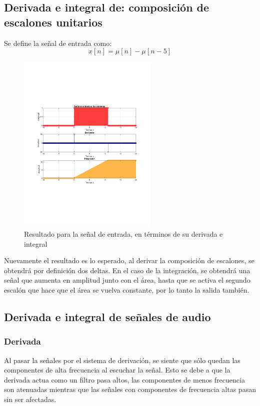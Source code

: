 	\subsection{Derivada e integral de: composición de escalones unitarios}
		 Se define la señal de entrada como:
		\begin{equation}
			x[n] = \mu [n] - \mu [n-5] 
		\end{equation}
		
		\begin{figure}[H]
			\center
			\includegraphics[width=0.6\textwidth,clip, trim = {2cm 7.0cm 2.2cm 7.0cm}]{../imgs/3_d.pdf}
			\caption{Resultado para la señal de entrada, en términos de su derivada e integral}
			\label{fig:3_d}
		\end{figure}
		
		Nuevamente el resultado es lo esperado, al derivar la composición de escalones, se obtendrá por definición dos deltas. En el caso de la integración, se obtendrá una señal que aumenta en amplitud junto con el área, hasta que se activa el segundo escalón que hace que el área se vuelva constante, por lo tanto la salida también. 
		
	\subsection{Derivada e integral de señales de audio}
		\subsubsection{Derivada}
			Al pasar la señales por el sistema de derivación, se siente que sólo quedan las componentes de alta frecuencia al escuchar la señal. Esto se debe a que la derivada actua como un filtro pasa altos, las componentes de menos frecuencia son atenuadas mientras que las señales con componentes de frecuencia altas pasan sin ser afectadas.
